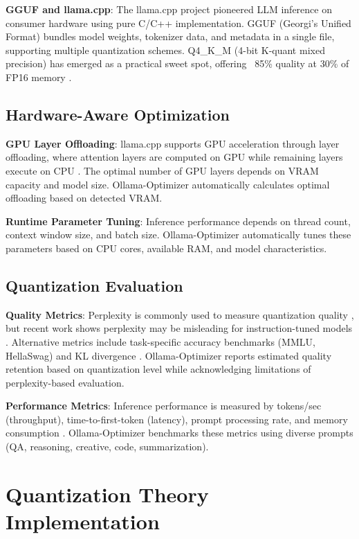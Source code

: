 \documentclass[journal]{IEEEtran}
\begin{document}
\textbf{GGUF and llama.cpp}: The llama.cpp project \cite{gerganov2023} pioneered LLM inference on consumer hardware using pure C/C++ implementation. GGUF (Georgi's Unified Format) bundles model weights, tokenizer data, and metadata in a single file, supporting multiple quantization schemes. Q4\_K\_M (4-bit K-quant mixed precision) has emerged as a practical sweet spot, offering ~85\% quality at 30\% of FP16 memory \cite{llamacpp2023}.

\subsection{Hardware-Aware Optimization}

\textbf{GPU Layer Offloading}: llama.cpp supports GPU acceleration through layer offloading, where attention layers are computed on GPU while remaining layers execute on CPU \cite{llamacpp2023}. The optimal number of GPU layers depends on VRAM capacity and model size. Ollama-Optimizer automatically calculates optimal offloading based on detected VRAM.

\textbf{Runtime Parameter Tuning}: Inference performance depends on thread count, context window size, and batch size. Ollama-Optimizer automatically tunes these parameters based on CPU cores, available RAM, and model characteristics.

\subsection{Quantization Evaluation}

\textbf{Quality Metrics}: Perplexity is commonly used to measure quantization quality \cite{frantar2022}, but recent work shows perplexity may be misleading for instruction-tuned models \cite{liu2024}. Alternative metrics include task-specific accuracy benchmarks (MMLU, HellaSwag) and KL divergence \cite{llamacpp2023}. Ollama-Optimizer reports estimated quality retention based on quantization level while acknowledging limitations of perplexity-based evaluation.

\textbf{Performance Metrics}: Inference performance is measured by tokens/sec (throughput), time-to-first-token (latency), prompt processing rate, and memory consumption \cite{lin2023}. Ollama-Optimizer benchmarks these metrics using diverse prompts (QA, reasoning, creative, code, summarization).

\section{Quantization Theory Implementation}
\end{document}
